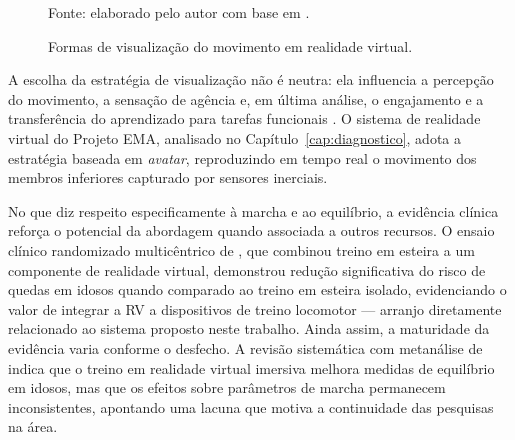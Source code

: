 \begin{figure}[htb]
	\centering
	\caption{Formas de visualização do movimento em realidade virtual.}
	\label{fig:visualizacao}
	\vspace{6pt}

	\vspace{4pt}
	{\footnotesize Fonte: elaborado pelo autor com base em .}
\end{figure}

A escolha da estratégia de visualização não é neutra: ela influencia a percepção do
movimento, a sensação de agência e, em última análise, o engajamento e a transferência do
aprendizado para tarefas funcionais \cite{ferreiradossantos2016,macchitella2023}. O
sistema de realidade virtual do Projeto EMA, analisado no Capítulo~\ref{cap:diagnostico},
adota a estratégia baseada em \emph{avatar}, reproduzindo em tempo real o movimento dos
membros inferiores capturado por sensores inerciais.

No que diz respeito especificamente à marcha e ao equilíbrio, a evidência clínica reforça
o potencial da abordagem quando associada a outros recursos. O ensaio clínico randomizado
multicêntrico de , que combinou treino em esteira a um componente
de realidade virtual, demonstrou redução significativa do risco de quedas em idosos quando
comparado ao treino em esteira isolado, evidenciando o valor de integrar a RV a
dispositivos de treino locomotor --- arranjo diretamente relacionado ao sistema proposto
neste trabalho. Ainda assim, a maturidade da evidência varia conforme o desfecho. A
revisão sistemática com metanálise de  indica que o treino em
realidade virtual imersiva melhora medidas de equilíbrio em idosos, mas que os efeitos
sobre parâmetros de marcha permanecem inconsistentes, apontando uma lacuna que motiva a
continuidade das pesquisas na área.

